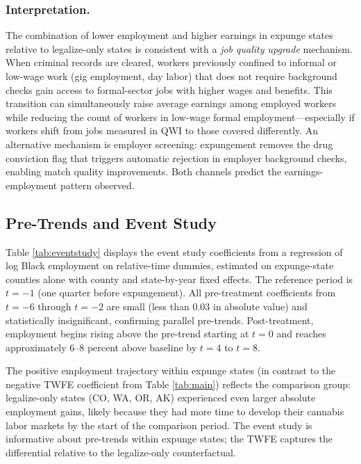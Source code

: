 \documentclass[12pt]{article}
\begin{document}
\subsubsection*{Interpretation.} The combination of lower employment and higher earnings in expunge states relative to legalize-only states is consistent with a \textit{job quality upgrade} mechanism. When criminal records are cleared, workers previously confined to informal or low-wage work (gig employment, day labor) that does not require background checks gain access to formal-sector jobs with higher wages and benefits. This transition can simultaneously raise average earnings among employed workers while reducing the count of workers in low-wage formal employment---especially if workers shift from jobs measured in QWI to those covered differently. An alternative mechanism is employer screening: expungement removes the drug conviction flag that triggers automatic rejection in employer background checks, enabling match quality improvements. Both channels predict the earnings-employment pattern observed.

\subsection{Pre-Trends and Event Study}



Table \ref{tab:eventstudy} displays the event study coefficients from a regression of log Black employment on relative-time dummies, estimated on expunge-state counties alone with county and state-by-year fixed effects. The reference period is $t = -1$ (one quarter before expungement). All pre-treatment coefficients from $t = -6$ through $t = -2$ are small (less than 0.03 in absolute value) and statistically insignificant, confirming parallel pre-trends. Post-treatment, employment begins rising above the pre-trend starting at $t = 0$ and reaches approximately 6--8 percent above baseline by $t = 4$ to $t = 8$.

The positive employment trajectory within expunge states (in contrast to the negative TWFE coefficient from Table \ref{tab:main}) reflects the comparison group: legalize-only states (CO, WA, OR, AK) experienced even larger absolute employment gains, likely because they had more time to develop their cannabis labor markets by the start of the comparison period. The event study is informative about pre-trends within expunge states; the TWFE captures the differential relative to the legalize-only counterfactual.
\end{document}
